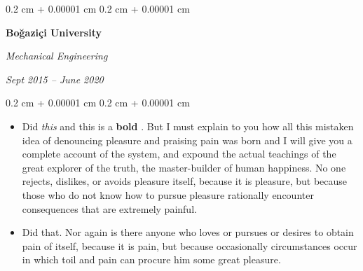 \documentclass[10pt, letterpaper]{article}
\newenvironment{highlights}{
    \begin{itemize}[
        topsep=0.10 cm,
        parsep=0.10 cm,
        partopsep=0pt,
        itemsep=0pt,
        leftmargin=0.4 cm + 10pt
    ]
}{
    \end{itemize}
} %
\newenvironment{onecolentry}{
    \begin{adjustwidth}{
        0.2 cm + 0.00001 cm
    }{
        0.2 cm + 0.00001 cm
    }
}{
    \end{adjustwidth}
} %
\newenvironment{twocolentry}[2][]{
    \onecolentry
    \def\secondColumn{#2}
    \setcolumnwidth{\fill, 4.5 cm}
    \begin{paracol}{2}
}{
    \switchcolumn \raggedleft \secondColumn
    \end{paracol}
    \endonecolentry
} %
\let\hrefWithoutArrow\href
\renewcommand{\href}[2]{\hrefWithoutArrow{#1}{\ifthenelse{\equal{#2}{}}{ }{#2 }\raisebox{.15ex}{\footnotesize \faExternalLink*}}}
\begin{document}
        \vspace{0.2 cm}

        \begin{twocolentry}{
            
            
        \textit{Sept 2015 – June 2020}}
            \textbf{Boğaziçi University}

            \textit{Mechanical Engineering}
        \end{twocolentry}
        \vspace{0.10 cm}
        \begin{onecolentry}
            \begin{highlights}
                \item Did \textit{this} and this is a \textbf{bold} \href{https://example.com}{link}. But I must explain to you how all this mistaken idea of denouncing pleasure and praising pain was born and I will give you a complete account of the system, and expound the actual teachings of the great explorer of the truth, the master-builder of human happiness. No one rejects, dislikes, or avoids pleasure itself, because it is pleasure, but because those who do not know how to pursue pleasure rationally encounter consequences that are extremely painful.
                \item Did that. Nor again is there anyone who loves or pursues or desires to obtain pain of itself, because it is pain, but because occasionally circumstances occur in which toil and pain can procure him some great pleasure.
            \end{highlights}
        \end{onecolentry}


        \vspace{0.2 cm}
\end{document}
